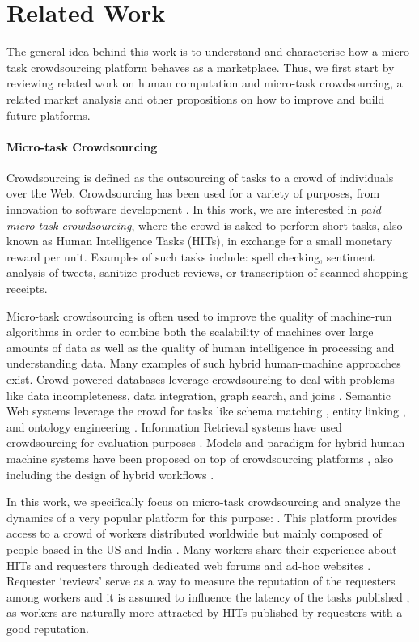 \section{Related Work}\label{sec:relwork}

The general idea behind this work is to understand and characterise how a micro-task crowdsourcing platform behaves as a marketplace. Thus, we first start by reviewing related work on human computation and micro-task crowdsourcing, a related market analysis and other propositions on how to improve and build future platforms.

\paragraph{Micro-task Crowdsourcing}
Crowdsourcing is defined as the outsourcing of tasks to a crowd of individuals over the Web. Crowdsourcing has been used for a variety of purposes, from innovation to software development \cite{platforms}. 
In this work, we are interested in \emph{paid micro-task crowdsourcing}, where the crowd is asked to perform short tasks, also known as Human Intelligence Tasks (HITs), in exchange for a small monetary reward per unit. Examples of such tasks include: spell checking, sentiment analysis of tweets, sanitize product reviews, or transcription of scanned shopping receipts.

Micro-task crowdsourcing is often used to improve the quality of machine-run algorithms in order to combine both the scalability of machines over large amounts of data as well as the quality of human intelligence in processing and understanding data. Many examples of such hybrid human-machine approaches exist.
% 
Crowd-powered databases \cite{crowddb} leverage crowdsourcing to deal with problems like  data incompleteness,  data integration, graph search, and joins \cite{crowder,graphsearch,crowdjoins}.
% 
Semantic Web systems leverage the crowd for tasks like schema matching \cite{crowdmap}, entity linking \cite{zencrowd}, and ontology engineering \cite{bioonto}.
% 
Information Retrieval systems have used crowdsourcing for evaluation purposes \cite{mizzaroalonso}.
% 
Models and paradigm for hybrid human-machine systems have been proposed on top of crowdsourcing platforms \cite{crowdcomputer}, also including the design of hybrid workflows \cite{workflows}.

In this work, we specifically focus on micro-task crowdsourcing and analyze the dynamics of a  very popular  platform for this purpose: \amt{}. This platform provides access to a crowd of workers distributed worldwide but mainly composed of people based in the US and India \cite{mturk}. Many \amt{} workers share their experience about HITs and requesters through dedicated web forums and ad-hoc websites \cite{turkopticon}. Requester `reviews' serve as a way to measure the reputation of the requesters among workers and it is assumed to influence the latency of the tasks published \cite{TOreputation}, as workers are naturally more attracted by HITs published by  requesters with a good reputation.



